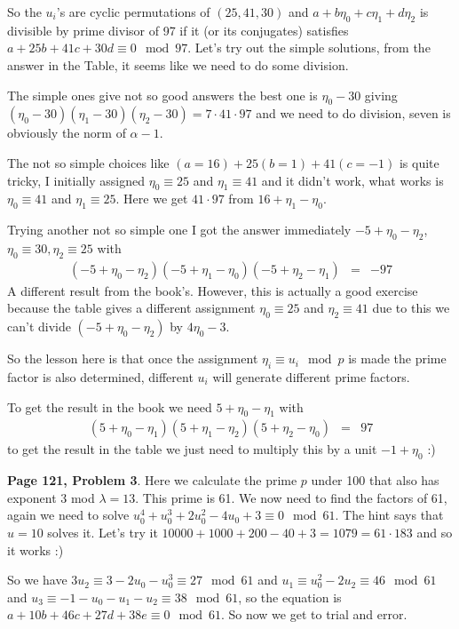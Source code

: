 \documentclass[aps,preprint,preprintnumbers,nofootinbib,showpacs,prd]{revtex4-1}
\newcommand{\nbea}{\begin{eqnarray*}}
\newcommand{\neea}{\end{eqnarray*}}
\begin{document}
So the $u_i$'s are cyclic permutations of $(25,41,30)$ and $a + b\eta_0 + c\eta_1 + d\eta_2$ is divisible by prime divisor of 97 if it (or its conjugates) satisfies $a + 25b + 41c + 30d \equiv 0 \mod{97}$. Let's try out the simple solutions, from the answer in the Table, it seems like we need to do some division.

The simple ones give not so good answers the best one is $\eta_0 - 30$ giving $(\eta_0 - 30)(\eta_1 - 30)(\eta_2 - 30) = 7 \cdot 41 \cdot 97$ and we need to do division, seven is obviously the norm of $\alpha - 1$.

The not so simple choices like $(a=16) + 25(b=1) + 41(c=-1)$ is quite tricky, I initially assigned $\eta_0 \equiv 25$ and $\eta_1 \equiv 41$ and it didn't work, what works is $\eta_0 \equiv 41$ and $\eta_1 \equiv 25$. Here we get $41 \cdot 97$ from $16 + \eta_1 - \eta_0$.

Trying another not so simple one I got the answer immediately $-5 + \eta_0 - \eta_2$, $\eta_0 \equiv 30, \eta_2 \equiv 25$ with 
%
\nbea
(-5 + \eta_0 - \eta_2)(-5 + \eta_1 - \eta_0)(-5 + \eta_2 - \eta_1) & = & -97
\neea
%
A different result from the book's. However, this is actually a good exercise because the table gives a different assignment $\eta_0 \equiv 25$ and $\eta_2 \equiv 41$ due to this we can't divide $(-5 + \eta_0 - \eta_2)$ by $4\eta_0 - 3$.

So the lesson here is that once the assignment $\eta_i \equiv u_i \mod{p}$ is made the prime factor is also determined, different $u_i$ will generate different prime factors.

To get the result in the book we need $5 + \eta_0 - \eta_1$ with
%
\nbea
(5 + \eta_0 - \eta_1)(5 + \eta_1 - \eta_2)(5 + \eta_2 - \eta_0) & = & 97
\neea
%
to get the result in the table we just need to multiply this by a unit $-1 + \eta_0$ :)

{\bf Page 121, Problem 3}. Here we calculate the prime $p$ under 100 that also has exponent 3 mod $\lambda = 13$. This prime is 61. We now need to find the factors of 61, again we need to solve $u_0^4 + u_0^3 + 2u_0^2 - 4u_0 + 3 \equiv 0 \mod{61}$. The hint says that $u = 10$ solves it. Let's try it $10000 + 1000 + 200 - 40 + 3 = 1079 = 61 \cdot 183$ and so it works :)

So we have $3u_2 \equiv 3 - 2u_0 - u_0^3 \equiv 27 \mod{61}$ and $u_1 \equiv u_0^2 - 2u_2 \equiv 46 \mod{61}$ and $u_3 \equiv -1 - u_0 - u_1 - u_2 \equiv 38 \mod{61}$, so the equation is $a + 10b + 46c + 27d +38e \equiv 0 \mod{61}$. So now we get to trial and error.
\end{document}
